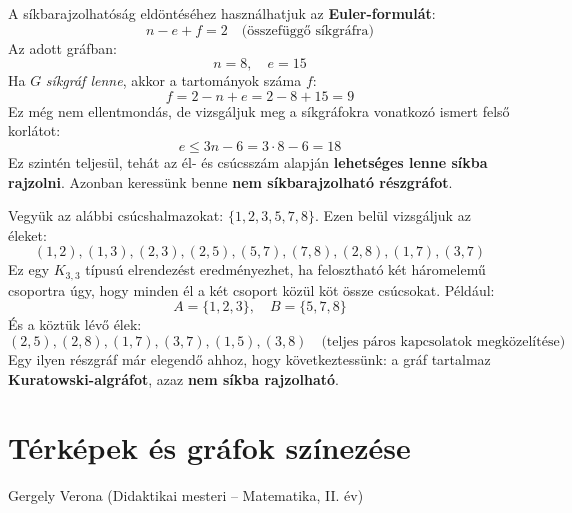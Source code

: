 \begin{solution}
	A síkbarajzolhatóság eldöntéséhez használhatjuk az \textbf{Euler-formulát}:
	\[
	n-e+f=2\quad\text{(összefüggő síkgráfra)}
	\]
	Az adott gráfban:
	\[
	n=8,\quad e=15
	\]
	Ha $G$ \emph{síkgráf lenne}, akkor a tartományok száma $f$:
	\[
	f=2-n+e=2-8+15=9
	\]
	Ez még nem ellentmondás, de vizsgáljuk meg a síkgráfokra vonatkozó
	ismert felső korlátot:
	\[
	e\leq3n-6=3\cdot8-6=18
	\]
	Ez szintén teljesül, tehát az él- és csúcsszám alapján \textbf{lehetséges
		lenne síkba rajzolni}. Azonban keressünk benne \textbf{nem síkbarajzolható
		részgráfot}.
	
	Vegyük az alábbi csúcshalmazokat: $\{1,2,3,5,7,8\}$. Ezen belül vizsgáljuk az éleket: 
	\[
	(1,2),(1,3),(2,3),(2,5),(5,7),(7,8),(2,8),(1,7),(3,7)
	\]
	Ez egy $K_{3,3}$ típusú elrendezést eredményezhet, ha felosztható
	két háromelemű csoportra úgy, hogy minden él a két csoport közül köt
	össze csúcsokat. Például:
	\[
	A=\{1,2,3\},\quad B=\{5,7,8\}
	\]
	És a köztük lévő élek:
	\[
	(2,5),(2,8),(1,7),(3,7),(1,5),(3,8)\quad\text{(teljes páros kapcsolatok megközelítése)}
	\]
	Egy ilyen részgráf már elegendő ahhoz, hogy következtessünk: a gráf
	tartalmaz \textbf{Kuratowski-algráfot}, azaz \textbf{nem síkba rajzolható}.
\end{solution}



\section{Térképek és gráfok színezése}\label{sec:terkepek}
\begin{description}
	{\large \item [{Szerző:}] Gergely Verona (Didaktikai mesteri -- Matematika, II. év) }
\end{description}

